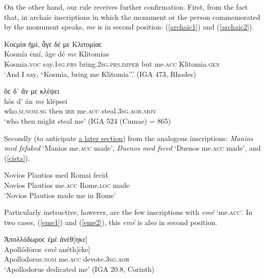 On the other hand, our rule receives further confirmation. First, from the fact that, in archaic inscriptions in which the monument or the person commemorated by the monument speaks, \textit{me} is in second position: (\ref{archaic1}) and (\ref{archaic2}).

\begin{exe}
\ex Κοϲμία ἠμί, ἆγε δέ {με} Κλιτομίαϲ\\
\gll Kosmía ēmí, âge dé \emph{me} Klitomías\\
Kosmia.\textsc{voc} say.\textsc{1sg.prs} bring.\textsc{2sg.prs.imper} but me.\textsc{acc} Klitomia.\textsc{gen}\\
\trans `And I say, ``Kosmia, bring me Klitomia''.' (IGA 473, Rhodes)
\label{archaic1}
\end{exe}

\begin{exe}
\ex ὃϲ δ᾽ ἄν {με} κλέψει\\
\gll hòs d' án \emph{me} klépsei\\
who.\textsc{m.nom.sg} then \textsc{irr} me.\textsc{acc} steal.\textsc{3sg.aor.sbjv}\\
\trans `who then might steal me' (IGA 524 (Cumae) = \citet{Kaibel1890} 865)
\label{archaic2}
\end{exe}

Secondly (to anticipate \hyperlink{latinpron}{a later section}) from the analogous  inscriptions: \textit{Manios med fefaked} `Manios me.\textsc{acc} made', \textit{Duenos med feced} `Duenos me.\textsc{acc} made', and (\ref{cista}).

\begin{exe}
\ex
\gll Novios Plautios med Romai fecid\\
Novios Plautios me.\textsc{acc} Rome.\textsc{loc} made\\
\trans `Novios Plautios made me in Rome'
\label{cista}
\end{exe}

\label{eme}Particularly instructive, however, are the few inscriptions with \textit{emé} `me.\textsc{acc}'. In two cases, (\ref{eme1}) and (\ref{eme2}), this \textit{emé} is also in second position.

\begin{exe}
\ex Ἀπολλόδωροϲ {ἐμὲ} ἀνέθ{[}ηκε{]}\\
\gll Apollódōros \emph{emè} anéth{[}ēke{]}\\
Apollodorus.\textsc{nom} me.\textsc{acc} devote.\textsc{3sg.aor}\\
\trans `Apollodorus dedicated me' (IGA 20.8, Corinth)
\label{eme1}
\end{exe}

